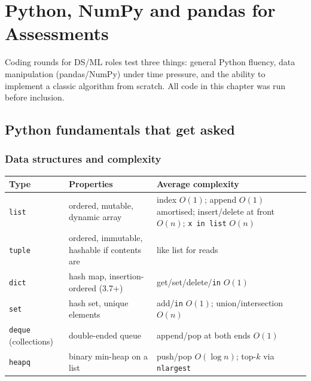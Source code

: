 \chapter{Python, NumPy and pandas for Assessments}

Coding rounds for DS/ML roles test three things: general Python fluency, data manipulation (pandas/NumPy) under time pressure, and the ability to implement a classic algorithm from scratch. All code in this chapter was run before inclusion.

\section{Python fundamentals that get asked}

\subsection{Data structures and complexity}
\begin{tabular}{@{}p{}p{}p{}@{}}
\toprule
Type & Properties & Average complexity\\
\midrule
\texttt{list} & ordered, mutable, dynamic array & index $O(1)$; append $O(1)$ amortised; insert/delete at front $O(n)$; \texttt{x in list} $O(n)$\\
\texttt{tuple} & ordered, immutable, hashable if contents are & like list for reads\\
\texttt{dict} & hash map, insertion-ordered (3.7+) & get/set/delete/\texttt{in} $O(1)$\\
\texttt{set} & hash set, unique elements & add/\texttt{in} $O(1)$; union/intersection $O(n)$\\
\texttt{deque} (collections) & double-ended queue & append/pop at both ends $O(1)$\\
\texttt{heapq} & binary min-heap on a list & push/pop $O(\log n)$; top-$k$ via \texttt{nlargest}\\
\bottomrule
\end{tabular}

